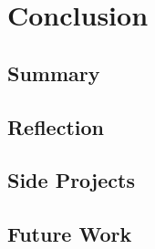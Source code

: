 \documentclass{l4proj}
\begin{document}






\chapter{Conclusion}

\section{Summary}

\section{Reflection}

\section{Side Projects}

\section{Future Work}


%
%




\end{document}
